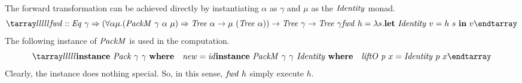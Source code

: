 \documentclass{article}
\theoremstyle{definition}
\newcommand{\texteq}{\mathrel{\texttt{==}}}
\begin{document}
The forward transformation can be achieved directly by instantiating $\alpha$ as $\gamma$ and $\mu$ as the $\mathit{Identity}$ monad.
\[
\bb
\mi{fwd} :: \mi{Eq}~\gamma \Rightarrow (
 \forall \alpha \mu. (\mi{PackM}~\gamma~\alpha~\mu) \Rightarrow 
 \mi{Tree}~\alpha \to \mu~(\mi{Tree}~\alpha))
 \to \mi{Tree}~\gamma \to \mi{Tree}~\gamma\\
\mi{fwd}~h = \lambda s. 
    \key{let}~\mi{Identity}~v = h~s~\key{in}~v 
\ee
\]
The following instance of $\mathit{PackM}$ is used in the computation.
\[
\bb
 \key{instance}~\mi{Pack}~\gamma~\gamma~\key{where} \\
 \quad \mi{new} = \mi{id} \\
 \key{instance}~\mi{PackM}~\gamma~\gamma~\mi{Identity}~\key{where}\\
 \quad \mi{liftO}~\mi{p}~x = \mi{Identity}~p~x 
\ee 
\]
Clearly, the instance does nothing special. So, in this sense, $\mathit{fwd}~h$ simply execute $h$.

\end{document}
